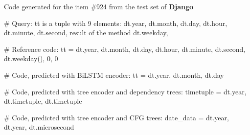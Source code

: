 \begin{codelist}{Code generated for the item \#924 from the test set of \textbf{Django}}
\begin{verbnobox}[\verbarg]
# Query:
tt is a tuple with 9 elements: dt.year, dt.month,
dt.day, dt.hour, dt.minute, dt.second, 
result of the method dt.weekday,

# Reference code:
tt = dt.year, dt.month, dt.day, dt.hour, 
    dt.minute, dt.second, dt.weekday(), 0, 0

# Code, predicted with BiLSTM encoder:
tt = dt.year, dt.month, dt.day
        
# Code, predicted with tree encoder and dependency trees:
timetuple = dt.year, dt.timetuple, dt.timetuple

# Code, predicted with tree encoder and CFG trees:
date_data = dt.year, dt.year, dt.microsecond
\end{verbnobox}
\label{code:django2}
\end{codelist}





